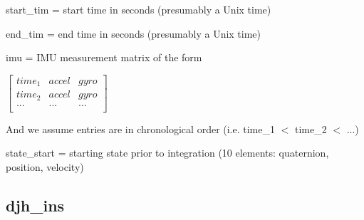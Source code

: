 \documentclass[11pt,a4paper]{article}
\begin{document}
\begin{itemize}
		start\_tim = start time in seconds (presumably a Unix time)
		
        end\_tim = end time in seconds (presumably a Unix time)
        
        imu = IMU measurement matrix of the form

		$\left[\begin{array}{ccc}
					time_1 & accel & gyro \\
					time_2 & accel & gyro \\
					...    & ...   & ...  \\	
		\end{array}\right]$
        
        And we assume entries are in chronological order (i.e. time\_1 $<$ time\_2 $<$ ...)
        
        state\_start = starting state prior to integration (10 elements: quaternion, position, velocity)
	\end{itemize}

	\subsection{djh\_ins}
\end{document}
